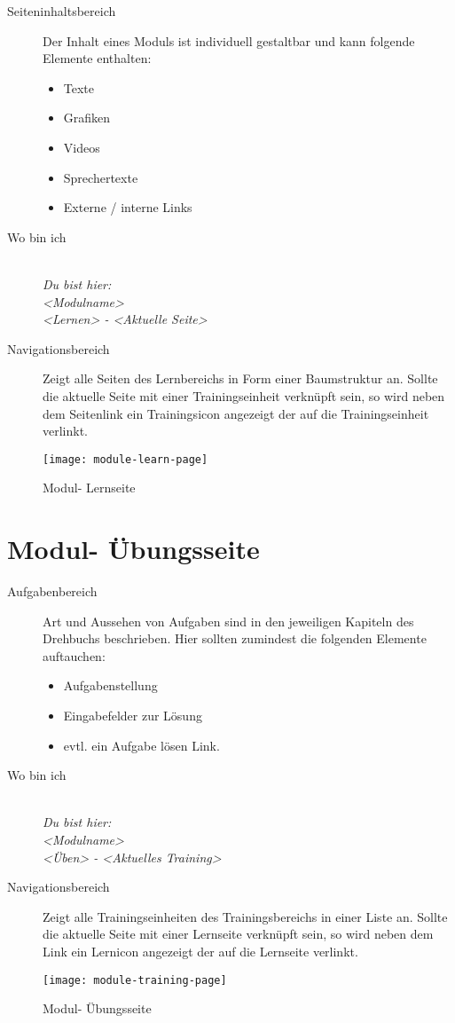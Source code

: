 \begin{description}
  \item[Seiteninhaltsbereich] Der Inhalt eines Moduls ist individuell gestaltbar und kann folgende Elemente enthalten:
  \begin{itemize}
    \item Texte
    \item Grafiken
    \item Videos
    \item Sprechertexte
    \item Externe / interne Links
  \end{itemize}
  
  \item[Wo bin ich] \emph{\\Du bist hier:\\<Modulname>\\<Lernen> - <Aktuelle Seite>}
  \item[Navigationsbereich] Zeigt alle Seiten des Lernbereichs in Form einer Baumstruktur an. Sollte die aktuelle Seite mit einer Trainingseinheit verknüpft sein, so wird neben dem Seitenlink ein Trainingsicon angezeigt %
  der auf die Trainingseinheit verlinkt.
  
\end{description}

\begin{figure}[!ht]
  \centering
  \texttt{[image: module-learn-page]}\\
  \caption{Modul- Lernseite}
  \label{fig:module-main-page}
\end{figure}

%
%
%
\section*{Modul- Übungsseite}
\label{sec:module-training-page}

\begin{description}
  \item[Aufgabenbereich] Art und Aussehen von Aufgaben sind in den jeweiligen Kapiteln des Drehbuchs beschrieben. Hier sollten zumindest die folgenden Elemente auftauchen:
  \begin{itemize}
    \item Aufgabenstellung
    \item Eingabefelder zur Lösung
    \item evtl. ein Aufgabe lösen Link.
  \end{itemize}
  \item[Wo bin ich] \emph{\\Du bist hier:\\<Modulname>\\<Üben> - <Aktuelles Training>}
  \item[Navigationsbereich] Zeigt alle Trainingseinheiten des Trainingsbereichs in einer Liste an. Sollte die aktuelle Seite mit einer Lernseite verknüpft sein, so wird neben dem Link ein Lernicon angezeigt 
  der auf die Lernseite verlinkt.
\end{description}

\begin{figure}[!ht]
  \centering
  \texttt{[image: module-training-page]}\\
  \caption{Modul- Übungsseite}
  \label{fig:module-training-page}
\end{figure}


\endinput 
